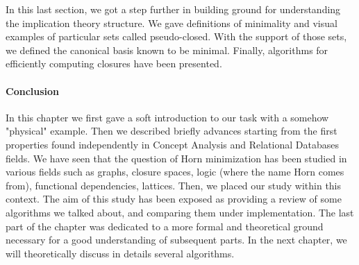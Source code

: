 \vspace{1.2em}


In this last section, we got a step further in building ground for understanding
the implication theory structure. We gave definitions of minimality and visual
examples of particular sets called pseudo-closed. With the support of those
sets, we defined the canonical basis known to be minimal. Finally, algorithms
for efficiently computing closures have been presented. 


\paragraph{Conclusion} In this chapter we first gave a soft introduction to our 
task with a somehow "physical" example. Then we described briefly advances 
starting from the first properties found independently in Concept Analysis and 
Relational Databases fields. We have seen that the question of Horn 
minimization has been studied in various fields such as graphs, closure spaces, 
logic (where the name Horn comes from), functional dependencies, lattices. 
Then, we placed our study within this context. The aim of this study has been 
exposed as providing a review of some algorithms we talked about, and comparing 
them under implementation. The last part of the chapter was dedicated to a more 
formal and theoretical ground necessary for a good understanding of subsequent 
parts. In the next chapter, we will theoretically discuss in details several 
algorithms.

